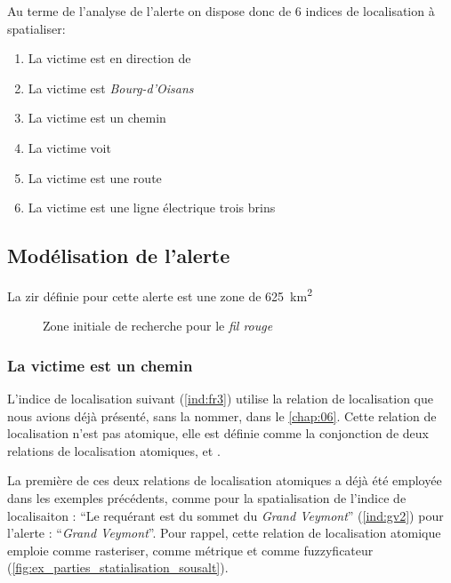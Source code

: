 Au terme de l'analyse de l'alerte on dispose donc de 6 indices de
localisation à spatialiser:
% 
\begin{enumerate}
\item \label{ind:fr1} La victime est en direction de
\item \label{ind:fr2} La victime est
   \emph{Bourg-d'Oisans} 
\item \label{ind:fr3} La victime est  un
  chemin
\item \label{ind:fr4} La victime voit
\item \label{ind:fr5} La victime est  une
  route
\item \label{ind:fr6} La victime est  une
  ligne électrique trois brins
\end{enumerate}



\subsection{Modélisation de l'alerte}
\label{subsec:9-4-2}

La \ac{zir} définie pour cette alerte est une zone de
\SI{625}{\kilo\meter\squared}

\begin{figure}
  \centering
  
  \caption{Zone initiale de recherche pour le \emph{fil rouge}}
  \label{fig:zir_fil_rouge}
\end{figure}

\subsubsection{La victime est \protect{} un chemin}

L'indice de localisation suivant (\ref{ind:fr3}) utilise la relation
de localisation  que nous avions déjà
présenté, sans la nommer, dans le \autoref{chap:06}. Cette relation de
localisation n'est pas atomique, elle est définie comme la conjonction
de deux relations de localisation atomiques,
 et .

La première de ces deux relations de localisation atomiques
 a déjà été employée dans les exemples
précédents, comme pour la spatialisation de l'indice de localisaiton :
\enquote{Le requérant est  du sommet du
  \emph{Grand Veymont}} (\ref{ind:gv2}) pour l'alerte :
\enquote{\emph{Grand Veymont}}. Pour rappel, cette relation de
localisation atomique emploie  comme rasteriser,
 comme métrique et
 comme fuzzyficateur
(\autoref{fig:ex_parties_statialisation_sousalt}).

